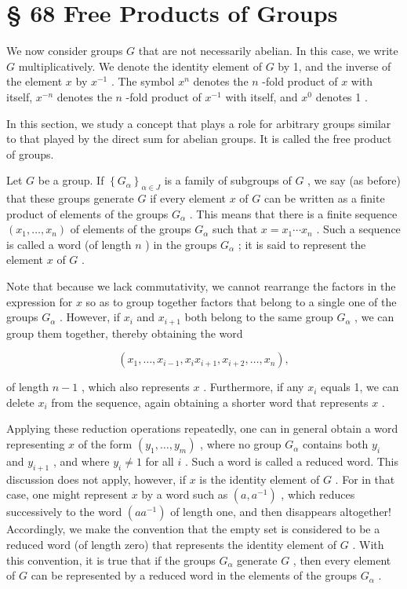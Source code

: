 \section*{§ 68 Free Products of Groups}

We now consider groups \(G\) that are not necessarily abelian. In this case, we write \(G\) multiplicatively. We denote the identity element of \(G\) by 1, and the inverse of the element \(x\) by \({x}^{-1}\) . The symbol \({x}^{n}\) denotes the \(n\) -fold product of \(x\) with itself, \({x}^{-n}\) denotes the \(n\) -fold product of \({x}^{-1}\) with itself, and \({x}^{0}\) denotes 1 .

In this section, we study a concept that plays a role for arbitrary groups similar to that played by the direct sum for abelian groups. It is called the free product of groups.

Let \(G\) be a group. If \({\left\{  {G}_{\alpha }\right\}  }_{\alpha  \in  J}\) is a family of subgroups of \(G\) , we say (as before) that these groups generate \(G\) if every element \(x\) of \(G\) can be written as a finite product of elements of the groups \({G}_{\alpha }\) . This means that there is a finite sequence \(\left( {{x}_{1},\ldots ,{x}_{n}}\right)\) of elements of the groups \({G}_{\alpha }\) such that \(x = {x}_{1}\cdots {x}_{n}\) . Such a sequence is called a word (of length \(n\) ) in the groups \({G}_{\alpha }\) ; it is said to represent the element \(x\) of \(G\) .

Note that because we lack commutativity, we cannot rearrange the factors in the expression for \(x\) so as to group together factors that belong to a single one of the groups \({G}_{\alpha }\) . However, if \({x}_{i}\) and \({x}_{i + 1}\) both belong to the same group \({G}_{\alpha }\) , we can group them together, thereby obtaining the word

\[
\left( {{x}_{1},\ldots ,{x}_{i - 1},{x}_{i}{x}_{i + 1},{x}_{i + 2},\ldots ,{x}_{n}}\right) ,
\]

of length \(n - 1\) , which also represents \(x\) . Furthermore, if any \({x}_{i}\) equals 1, we can delete \({x}_{i}\) from the sequence, again obtaining a shorter word that represents \(x\) .

Applying these reduction operations repeatedly, one can in general obtain a word representing \(x\) of the form \(\left( {{y}_{1},\ldots ,{y}_{m}}\right)\) , where no group \({G}_{\alpha }\) contains both \({y}_{i}\) and \({y}_{i + 1}\) , and where \({y}_{i} \neq  1\) for all \(i\) . Such a word is called a reduced word. This discussion does not apply, however, if \(x\) is the identity element of \(G\) . For in that case, one might represent \(x\) by a word such as \(\left( {a,{a}^{-1}}\right)\) , which reduces successively to the word \(\left( {a{a}^{-1}}\right)\) of length one, and then disappears altogether! Accordingly, we make the convention that the empty set is considered to be a reduced word (of length zero) that represents the identity element of \(G\) . With this convention, it is true that if the groups \({G}_{\alpha }\) generate \(G\) , then every element of \(G\) can be represented by a reduced word in the elements of the groups \({G}_{\alpha }\) .

